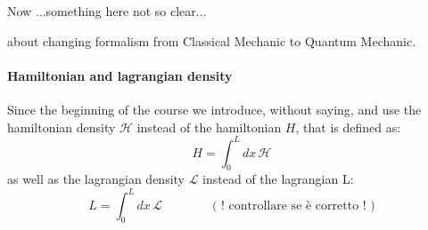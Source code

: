 \documentclass[class=article]{standalone}
\begin{document}
\vspace{10mm}
\large 
Now ...something here not so clear...

\normalsize
about changing formalism from Classical Mechanic to Quantum Mechanic.
\vspace{10mm}


\paragraph{Hamiltonian and lagrangian density}
Since the beginning of the course we introduce, without saying, and use the hamiltonian density $\mathcal{H}$ instead of the hamiltonian $H$, that is defined as:
\begin{equation*}
H = \int_0^L dx \, \mathcal{H}
\end{equation*}
as well as the lagrangian density $\mathcal{L}$ instead of the lagrangian L:
\begin{equation*}
L = \int_0^L dx \, \mathcal{L} \quad\quad\quad\quad \mbox{( ! controllare se è corretto ! )}
\end{equation*}
\end{document}
